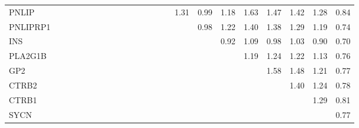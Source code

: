 \begin{longtable}{lrrrrrrrrrrrrrrrrrrrrrr}
PNLIP    &              &              &              &             &             &             &            &              &            &            &            &             &           &             &           1.31 &      0.99 &          1.18 &      1.63 &        1.47 &        1.42 &       1.28 &       0.84 \\
PNLIPRP1 &              &              &              &             &             &             &            &              &            &            &            &             &           &             &                &      0.98 &          1.22 &      1.40 &        1.38 &        1.29 &       1.19 &       0.74 \\
INS      &              &              &              &             &             &             &            &              &            &            &            &             &           &             &                &           &          0.92 &      1.09 &        0.98 &        1.03 &       0.90 &       0.70 \\
PLA2G1B  &              &              &              &             &             &             &            &              &            &            &            &             &           &             &                &           &               &      1.19 &        1.24 &        1.22 &       1.13 &       0.76 \\
GP2      &              &              &              &             &             &             &            &              &            &            &            &             &           &             &                &           &               &           &        1.58 &        1.48 &       1.21 &       0.77 \\
CTRB2    &              &              &              &             &             &             &            &              &            &            &            &             &           &             &                &           &               &           &             &        1.40 &       1.24 &       0.78 \\
CTRB1    &              &              &              &             &             &             &            &              &            &            &            &             &           &             &                &           &               &           &             &             &       1.29 &       0.81 \\
SYCN     &              &              &              &             &             &             &            &              &            &            &            &             &           &             &                &           &               &           &             &             &            &       0.77 \\
\end{longtable}


